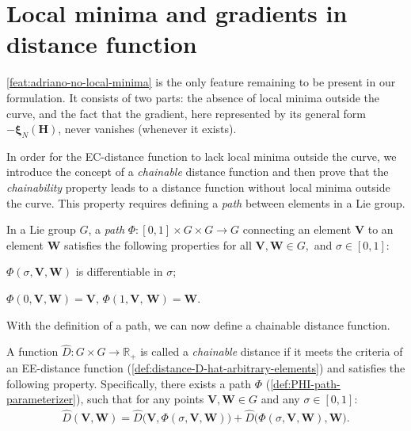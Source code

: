\section{Local minima and gradients in distance function}
\cref{feat:adriano-no-local-minima} is the only feature remaining to be present in our formulation. It consists of two parts: the absence of local minima outside the curve, and the fact that the gradient, here represented by its general form $-\boldsymbol{\xi}_N(\mathbf{H})$, never vanishes (whenever it exists).

In order for the EC-distance function to lack local minima outside the curve, we introduce the concept of a \emph{chainable} distance function and then prove that the \emph{chainability} property leads to a distance function without local minima outside the curve. This property requires defining a \emph{path} between elements in a Lie group.
\begin{definition}[Path]\label{def:PHI-path-parameterizer}
    In a Lie group $G$, a \emph{path} $\Phi:[0, 1] \times G \times G \to G$ connecting an element $\mathbf{V}$ to an element $\mathbf{W}$ satisfies the following properties for all $\mathbf{V}, \mathbf{W}\in G,$ and $\sigma\in[0,1]$:
    \begin{property}
        \item $\Phi(\sigma, \mathbf{V}, \mathbf{W})$ is differentiable in $\sigma$;\label{prop:path-continuous}
        \item $\Phi(0, \mathbf{V}, \mathbf{W}) = \mathbf{V},\,\Phi(1, \mathbf{V},\, \mathbf{W}) = \mathbf{W}$.\label{prop:path-initUfinalV}
    \end{property}
\end{definition}

With the definition of a path, we can now define a chainable distance function.
\begin{definition}\label{def:chainable-distance}
    A function $\widehat{D}: G \times G \to \mathbb{R}_+$ is called a \emph{chainable} distance if it meets the criteria of an EE-distance function (\cref{def:distance-D-hat-arbitrary-elements}) and satisfies the following property. Specifically, there exists a path $\Phi$ (\cref{def:PHI-path-parameterizer}), such that for any points $\mathbf{V}, \mathbf{W} \in G$ and any $\sigma \in [0,1]$:
    \begin{align*}
        \widehat{D}(\mathbf{V}, \mathbf{W}) = \widehat{D}\bigl(\mathbf{V}, \Phi(\sigma, \mathbf{V}, \mathbf{W})\bigr) + \widehat{D}\bigl(\Phi(\sigma, \mathbf{V}, \mathbf{W}), \mathbf{W} \bigr).
    \end{align*}
\end{definition}

